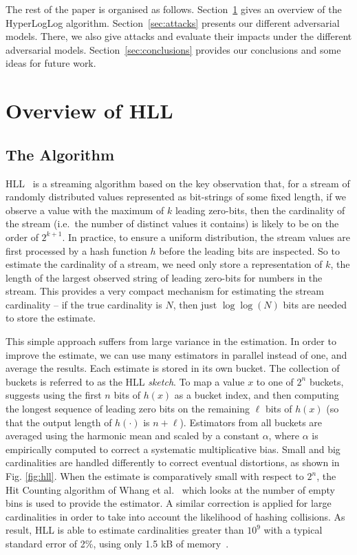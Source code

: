 \documentclass[11pt]{article}
\begin{document}
The rest of the paper is organised as follows. Section~\ref{sec:overview} gives an overview of the HyperLogLog algorithm. Section~\ref{sec:attacks} presents our different adversarial models. There, we also give attacks and evaluate their impacts under the different adversarial models. Section~\ref{sec:conclusions} provides our conclusions and some ideas for future work.



\section{Overview of HLL}\label{sec:overview}
\subsection{The Algorithm}
HLL~\cite{hll} is a streaming algorithm based on the key observation that, for a stream of randomly distributed values represented as bit-strings of some fixed length, if we observe a value with the maximum of $k$ leading zero-bits, then the cardinality of the stream (i.e.\ the number of distinct values it contains) is likely to be on the order of $2^{k+1}$. In practice, to ensure a uniform distribution, the stream values are first processed by a hash function $h$ before the leading bits are inspected. So to estimate the cardinality of a stream, we need only store a representation of $k$, the length of the largest observed string of leading zero-bits for numbers in the stream. This provides a very compact mechanism for estimating the stream cardinality -- if the true cardinality is $N$, then just $\log\log(N)$ bits are needed to store the estimate.

This simple approach suffers from large variance in the estimation. In order to improve the estimate, we can use many estimators in parallel instead of one, and average the results. Each estimate is stored in its own bucket. The collection of buckets is referred to as the HLL \emph{sketch}. To map a value $x$ to one of $2^n$ buckets, \cite{loglog} suggests using the first $n$ bits of $h(x)$ as a bucket index, and then computing the longest sequence of leading zero bits on the remaining $\ell$ bits of $h(x)$ (so that the output length of $h(\cdot)$ is $n+\ell$). Estimators from all buckets are averaged using the harmonic mean and scaled by a constant $\alpha$, where $\alpha$ is empirically computed to correct a systematic multiplicative bias. Small and big cardinalities are handled differently to correct eventual distortions, as shown in Fig. \ref{fig:hll}. When the estimate is comparatively small with respect to $2^n$, the Hit Counting algorithm of Whang et al.~\cite{hitcounting} which looks at the number of empty bins is used to provide the estimator. A similar correction is applied for large cardinalities in order to take into account the likelihood of hashing collisions. As result, HLL is able to estimate cardinalities greater than $10^9$ with a typical standard error of 2\%, using only 1.5 kB of memory~\cite{hll}.
\end{document}
